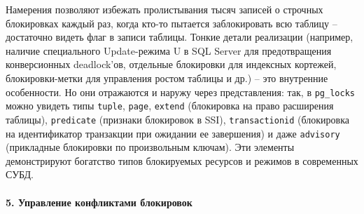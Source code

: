Намерения позволяют избежать пролистывания тысяч записей о строчных блокировках каждый раз, когда кто-то пытается заблокировать всю таблицу – достаточно видеть флаг в записи таблицы. Тонкие детали реализации (например, наличие специального Update-режима U в SQL Server для предотвращения конверсионных deadlock’ов, отдельные блокировки для индексных кортежей, блокировки-метки для управления ростом таблицы и др.) – это внутренние особенности. Но они отражаются и наружу через представления: так, в \texttt{pg\_locks} можно увидеть типы \texttt{tuple}, \texttt{page}, \texttt{extend} (блокировка на право расширения таблицы), \texttt{predicate} (признаки блокировок в SSI), \texttt{transactionid} (блокировка на идентификатор транзакции при ожидании ее завершения) и даже \texttt{advisory} (прикладные блокировки по произвольным ключам). Эти элементы демонстрируют богатство типов блокируемых ресурсов и режимов в современных СУБД.

\paragraph{5. Управление конфликтами блокировок} ~\\

